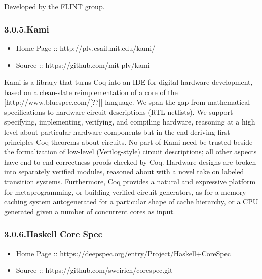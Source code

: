 \documentclass[12pt,twoside]{article}
\begin{document}
\noindent{}Developed by the FLINT group.%

\subsubsection{3.0.5.\hspace*{0.5em}Kami}\label{sec-kami}%

\begin{itemize}[noitemsep,topsep=\mdcompacttopsep]%

\item{}Home Page :: http://plv.csail.mit.edu/kami/%

\item{}Source :: https://github.com/mit-plv/kami%
\end{itemize}%

\noindent{}Kami is a library that turns Coq into an IDE for digital hardware
development, based on a clean-slate reimplementation of a core of the
[http://www.bluespec.com/[??]] language. We span the gap from mathematical specifications to
hardware circuit descriptions (RTL netlists). We support specifying,
implementing, verifying, and compiling hardware, reasoning at a high
level about particular hardware components but in the end deriving
first-principles Coq theorems about circuits. No part of Kami need be
trusted beside the formalization of low-level (Verilog-style) circuit
descriptions; all other aspects have end-to-end correctness proofs
checked by Coq. Hardware designs are broken into separately verified
modules, reasoned about with a novel take on labeled transition
systems. Furthermore, Coq provides a natural and expressive platform
for metaprogramming, or building verified circuit generators, as for a
memory caching system autogenerated for a particular shape of cache
hierarchy, or a CPU generated given a number of concurrent cores as
input.%

\subsubsection{3.0.6.\hspace*{0.5em}Haskell Core Spec}\label{sec-haskell-core-spec}%

\begin{itemize}[noitemsep,topsep=\mdcompacttopsep]%

\item{}Home Page :: https://deepspec.org/entry/Project/Haskell+CoreSpec%

\item{}Source :: https://github.com/sweirich/corespec.git%
\end{itemize}%
\end{document}
